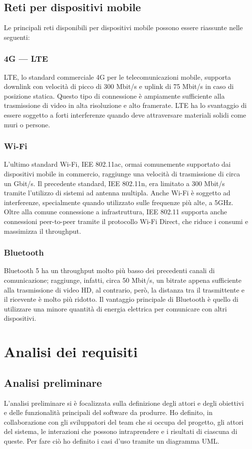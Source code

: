 			\subsection{Reti per dispositivi mobile}
			Le principali reti disponibili per dispositivi mobile possono essere riassunte nelle seguenti:
			\subsubsection{4G --- LTE}
			LTE, lo standard commerciale 4G per le telecomunicazioni mobile, supporta downlink con velocità di picco di 300 Mbit/s e uplink di 75 Mbit/s in caso di posizione statica. Questo tipo di connessione è ampiamente sufficiente alla trasmissione di video in alta risoluzione e alto framerate. LTE ha lo svantaggio di essere soggetto a forti interferenze quando deve attraversare materiali solidi come muri o persone.
			\subsubsection{Wi-Fi}
			L'ultimo standard Wi-Fi, IEE 802.11ac, ormai comunemente supportato dai dispositivi mobile in commercio, raggiunge una velocità di trasmissione di circa un Gbit/s. Il precedente standard, IEE 802.11n, era limitato a 300 Mbit/s tramite l'utilizzo di sistemi ad antenna multipla. Anche Wi-Fi è soggetto ad interferenze, specialmente quando utilizzato sulle frequenze più alte, a 5GHz. Oltre alla comune connessione a infrastruttura, IEE 802.11 supporta anche connessioni peer-to-peer tramite il protocollo Wi-Fi Direct, che riduce i consumi e massimizza il throughput.
			\subsubsection{Bluetooth}
			Bluetooth 5 ha un throughput molto più basso dei precedenti canali di comunicazione; raggiunge, infatti, circa 50 Mbit/s, un bitrate appena sufficiente alla trasmissione di video HD, al contrario, però, la distanza tra il trasmittente e il ricevente è molto più ridotto. Il vantaggio principale di Bluetooth è quello di utilizzare una minore quantità di energia elettrica per comunicare con altri dispositivi.

\section{Analisi dei requisiti}
	 \subsection{Analisi preliminare}
	 L'analisi preliminare si è focalizzata sulla definizione degli attori e degli obiettivi e delle funzionalità principali del software da produrre.
	 Ho definito, in collaborazione con gli sviluppatori del team che si occupa del progetto, gli attori del sistema, le interazioni che possono intraprendere e i risultati di ciascuna di queste. Per fare ciò ho definito i casi d'uso tramite un diagramma UML.\@

